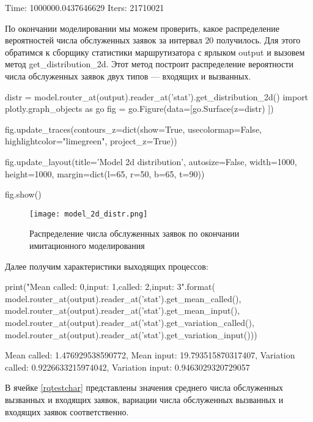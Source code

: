 \begin{pyout}
Time:  1000000.0437646629
Iters:  21710021
\end{pyout}

По окончании моделировании мы можем проверить, какое распределение вероятностей числа обслуженных заявок за интервал $20$ получилось. Для этого обратимся к сборщику статистики маршрутизатора с ярлыком output и вызовем метод get\_distribution\_2d. Этот метод построит распределение вероятности числа обслуженных заявок двух типов --- входящих и вызванных.
\begin{pyin}
distr = model.router_at(output).reader_at('stat').get_distribution_2d()
import plotly.graph_objects as go
fig = go.Figure(data=[go.Surface(z=distr) ])

fig.update_traces(contours_z=dict(show=True, usecolormap=False,
highlightcolor="limegreen", project_z=True))

fig.update_layout(title='Model 2d distribution', autosize=False,
width=1000, height=1000,
margin=dict(l=65, r=50, b=65, t=90))

fig.show()
\end{pyin}

\begin{figure}[H]
	\centering
	\texttt{[image: model\_2d\_distr.png]}
	\caption{Распределение числа обслуженных заявок по окончании имитационного моделирования} 
	\label{model_2d_distr}
\end{figure}

Далее получим характеристики выходящих процессов:

\begin{pyin} [rqtestchar]
print("Mean  called: {0},\nMean input: {1},\nVariation called: {2},\nVariation input: {3}".format(
model.router_at(output).reader_at('stat').get_mean_called(),
model.router_at(output).reader_at('stat').get_mean_input(),
model.router_at(output).reader_at('stat').get_variation_called(),
model.router_at(output).reader_at('stat').get_variation_input()))
\end{pyin}

\begin{pyout} 
Mean  called: 1.476929538590772,
Mean input: 19.793515870317407,
Variation called: 0.9226633215974042,
Variation input: 0.9463029320729057
\end{pyout}

В ячейке \ref{rqtestchar} представлены значения среднего числа обслуженных вызванных и входящих заявок, вариации числа обслуженных вызванных и входящих заявок соответственно.

